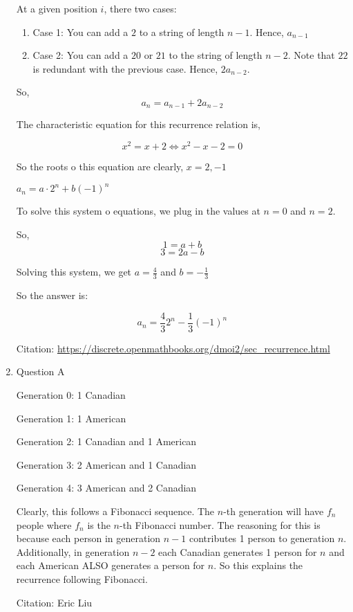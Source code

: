 \documentclass[12pt]{exam}
\begin{document}
\begin{enumerate}
At a given position $i$, there two cases: 

\begin{enumerate}
    \item Case 1: You can add a $2$ to a string of length $n - 1$. Hence, $a_{n - 1}$
    \item Case 2: You can add a $20$ or $21$ to the string of length $n - 2$. Note that $22$ is redundant with the previous case. Hence, $2a_{n - 2}$.
\end{enumerate}

So, 
$$
a_n = a_{n - 1} + 2a_{n - 2}
$$

The characteristic equation for this recurrence relation is, 

$$x^2 = x + 2 \iff x^2 - x - 2 = 0$$

So the roots o this equation are clearly, $x = 2, -1$

$a_n = a\cdot 2^n + b (-1)^n$

To solve this system o equations, we plug in the values at $n = 0$ and $n = 2$. 

So, 
$$
1 = a + b
$$
$$
3 = 2a - b
$$

Solving this system, we get $a = \frac{4}{3}$ and $b = -\frac{1}{3}$

So the answer is:

$$a_n = \frac{4}{3}2^n - \frac{1}{3}(-1)^n$$

Citation: \href{https://discrete.openmathbooks.org/dmoi2/sec_recurrence.html}{https://discrete.openmathbooks.org/dmoi2/sec\_recurrence.html}

\newpage

\item Question A

Generation 0: 1 Canadian

Generation 1: 1 American

Generation 2: 1 Canadian and 1 American

Generation 3: 2 American and 1 Canadian

Generation 4: 3 American and 2 Canadian

Clearly, this follows a Fibonacci sequence. The $n$-th generation will have $f_{n}$ people where $f_n$ is the $n$-th Fibonacci number. The reasoning for this is because each person in generation $n - 1$ contributes 1 person to generation $n$. Additionally, in generation $n - 2$ each Canadian generates 1 person for $n$ and each American ALSO generates a person for $n$. So this explains the recurrence following Fibonacci. 

Citation: Eric Liu

\end{enumerate}
\end{document}
